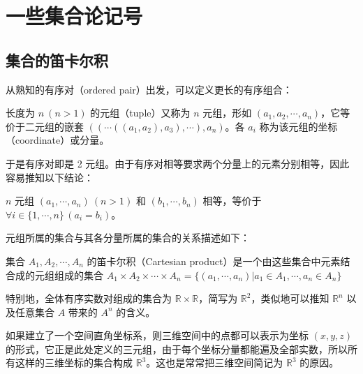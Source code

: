 \documentclass[cn,10pt,math=newtx,citestyle=gb7714-2015,bibstyle=gb7714-2015]{elegantbook}
\def\R{\mathbb R}
\begin{document}
\appendix

\chapter{一些集合论记号}
\section{集合的笛卡尔积}
从熟知的有序对（ordered pair）出发，可以定义更长的有序组合：
\begin{definition}[元组]
   长度为 $n\ (n>1)$ 的元组（tuple）又称为 $n$ 元组，形如 $(a_1,a_2,\cdots,a_n)$，它等价于二元组的嵌套 $((\cdots((a_1,a_2),a_3),\cdots),a_n)$。各 $a_i$ 称为该元组的坐标（coordinate）或分量。
\end{definition}
于是有序对即是 2 元组。由于有序对相等要求两个分量上的元素分别相等，因此容易推知以下结论：
\begin{theorem}[元组相等的条件]
    $n$ 元组 $(a_1,\cdots,a_n)\ (n>1)$ 和 $(b_1,\cdots,b_n)$ 相等，等价于 $\forall i\in\{1,\cdots,n\}\,(a_i=b_i)$。
\end{theorem}

元组所属的集合与其各分量所属的集合的关系描述如下：

\begin{definition}[笛卡尔积]\label{def:Crtsn_prdct}
    集合 $A_1,A_2,\cdots,A_n$ 的笛卡尔积（Cartesian product）是一个由这些集合中元素结合成的元组组成的集合 $A_1\times A_2\times\cdots\times A_n=\{(a_1,\cdots,a_n)|a_1\in A_1,\cdots,a_n\in A_n\}$
\end{definition}
特别地，全体有序实数对组成的集合为 $\R\times\R$，简写为 $\R^2$，类似地可以推知 $\R^n$ 以及任意集合 $A$ 带来的 $A^n$ 的含义。
\begin{instance}
如果建立了一个空间直角坐标系，则三维空间中的点都可以表示为坐标 $(x,y,z)$ 的形式，它正是此处定义的三元组，由于每个坐标分量都能遍及全部实数，所以所有这样的三维坐标的集合构成 $\R^3$。这也是常常把三维空间简记为 $\R^3$ 的原因。
\end{instance}
\end{document}
